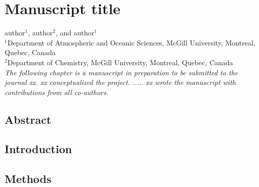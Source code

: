 \setcounter{reaction}{0}%


\chapter{Manuscript title} \label{chapter2}

author$^1$, author$^2$, and author$^1$ \\[30pt]
$^1$Department of Atmospheric and Oceanic Sciences, McGill University, Montreal, Quebec, Canada \\
$^2$Department of Chemistry, McGill University, Montreal, Quebec, Canada\\[30pt]
\textit{The following chapter is a manuscript in preparation to be submitted to the journal xx. xx conceptualized the project. ..... xx wrote the manuscript with contributions from all co-authors.}

\cleardoublepage
\section{Abstract}

\section{Introduction} \label{sec:intro}

\section{Methods} \label{sec:methods}

